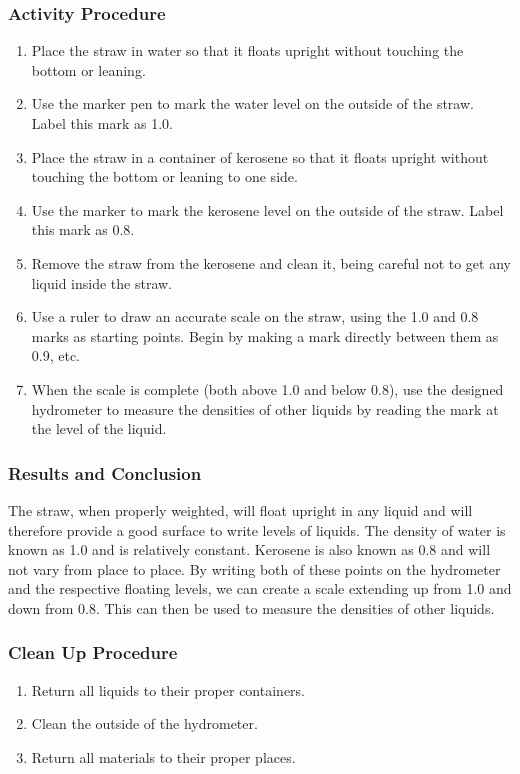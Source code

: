 \subsubsection*{Activity Procedure}
\begin{enumerate}
\item{Place the straw in water so that it floats upright without touching the bottom or leaning.} 
\item{Use the marker pen to mark the water level on the outside of the straw. Label this mark as 1.0.} 
\item{Place the straw in a container of kerosene so that it floats upright without touching the bottom or leaning to one side.} 
\item{Use the marker to mark the kerosene level on the outside of the straw. Label this mark as 0.8.}
\item{Remove the straw from the kerosene and clean it, being careful not to get any liquid inside the straw.} 
\item{Use a ruler to draw an accurate scale on the straw, using the 1.0 and 0.8 marks as starting points. Begin by making a mark directly between them as 0.9, etc.} 
\item{When the scale is complete (both above 1.0 and below 0.8), use the designed hydrometer to measure the densities of other liquids by reading the mark at the level of the liquid.} 
\end{enumerate}

\subsubsection*{Results and Conclusion}
The straw, when properly weighted, will float upright in any liquid and will therefore provide a good surface to write levels of liquids. The density of water is known as 1.0 and is relatively constant. Kerosene is also known as 0.8 and will not vary from place to place. By writing both of these points on the hydrometer and the respective floating levels, we can create a scale extending up from 1.0 and down from 0.8. This can then be used to measure the densities of other liquids.  

\subsubsection*{Clean Up Procedure}
\begin{enumerate}
\item{Return all liquids to their proper containers.} 
\item{Clean the outside of the hydrometer.} 
\item{Return all materials to their proper places.} 
\end{enumerate}

